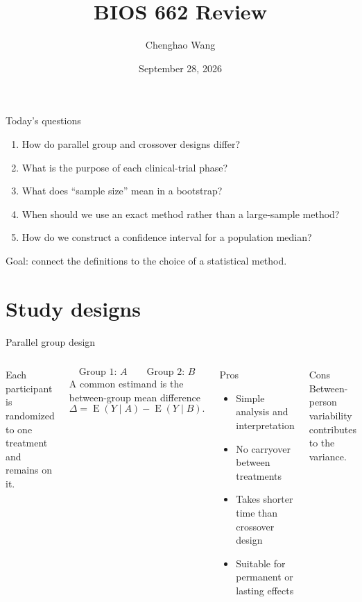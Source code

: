 \documentclass[aspectratio=169,11pt]{beamer}
\title{BIOS 662 Review}
\author{Chenghao Wang}
\institute{BIOS 662: Intermediate Statistical Methods}
\date{September 28, 2026}
\newcommand{\E}{\operatorname{E}}
\begin{document}
\begin{frame}
  \titlepage
\end{frame}

\begin{frame}{Today's questions}
  \begin{enumerate}
    \item How do parallel group and crossover designs differ?
    \item What is the purpose of each clinical-trial phase?
    \item What does ``sample size'' mean in a bootstrap?
    \item When should we use an exact method rather than a large-sample method?
    \item How do we construct a confidence interval for a population median?
  \end{enumerate}
  \vfill
  \alert{Goal:} connect the definitions to the choice of a statistical method.
\end{frame}

\section{Study designs}

\begin{frame}{Parallel group design}
  \begin{columns}[T]

      Each participant is randomized to one treatment and remains on it.

      \[
        \text{Group 1: } A \qquad \text{Group 2: } B
      \]
      A common estimand is the between-group mean difference
      \[
        \Delta = \E(Y\mid A)-\E(Y\mid B).
      \]
      \begin{exampleblock}{Pros}
        \begin{itemize}
          \item Simple analysis and interpretation
          \item No carryover between treatments
          \item Takes shorter time than crossover design
          \item Suitable for permanent or lasting effects
        \end{itemize}
      \end{exampleblock}
      \begin{alertblock}{Cons}
        Between-person variability contributes to the variance.
      \end{alertblock}
  \end{columns}
\end{frame}
\end{document}

